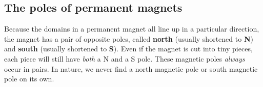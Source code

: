             \subsection{The poles of permanent magnets}
            \nopagebreak
        \label{m37830*id128690}Because the domains in a permanent magnet all line up in a particular direction, the magnet has a pair of opposite poles, called \textbf{north} (usually shortened to \textbf{N}) and \textbf{south} (usually shortened to \textbf{S}). Even if the magnet is cut into tiny pieces, each piece will still have \textsl{both} a N and a S pole. These magnetic poles \textsl{always} occur in pairs. In nature, we never find a north magnetic pole or south magnetic pole on its own.\par 
{}
        \label{m37830*id128728}
    \setcounter{subfigure}{0}
